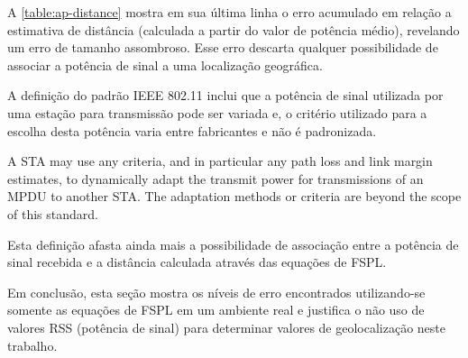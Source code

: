 A \autoref{table:ap-distance} mostra em sua última linha o erro acumulado
em relação a estimativa de distância (calculada a partir do valor de
potência médio), revelando um erro de tamanho assombroso.
Esse erro descarta qualquer possibilidade de associar a potência de sinal a uma
localização geográfica.

A definição do padrão IEEE 802.11 inclui que a potência de sinal
utilizada por uma estação para transmissão pode ser variada e, o critério utilizado
para a escolha desta potência varia entre fabricantes e não é padronizada.

\begin{citacao}[english]

	A STA may use any criteria, and in particular any path loss and link margin
	estimates, to dynamically adapt the transmit power for transmissions of an
	MPDU to another STA. The adaptation methods or criteria are beyond the scope
	of this standard. \

\end{citacao}

Esta definição afasta ainda mais a possibilidade de associação entre a potência
de sinal recebida e a distância calculada através das equações de FSPL.

Em conclusão, esta seção mostra os níveis de erro encontrados
utilizando-se somente as equações de FSPL em um ambiente real e justifica o não
uso de valores RSS (potência de sinal) para determinar valores de geolocalização neste trabalho.
